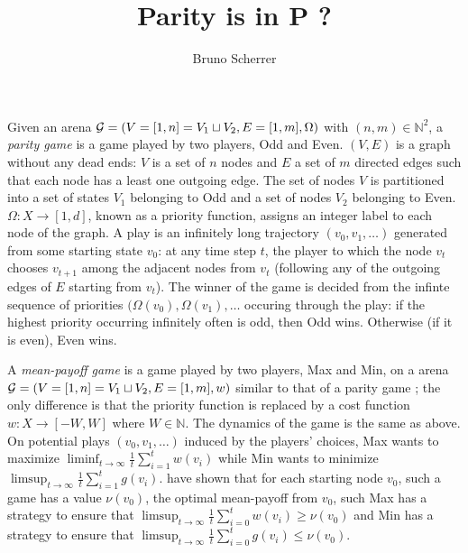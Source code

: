 \documentclass{article}
\title{Parity is in P ?}
\author{Bruno Scherrer}
\def\G{{\cal G}}
\def\N{\mathds N}
\begin{document}
\maketitle

\begin{abstract}
\end{abstract}


Given an arena $\G=(V=[1,n]=V_1 \sqcup V_2,E=[1,m],\Omega)$ with $(n,m) \in \N^2$, a \emph{parity game} is a game played by two players, Odd and Even.
$(V,E)$ is a graph without any dead ends: $V$ is a set of $n$ nodes and $E$ a set of $m$ directed edges such that each node has a least one outgoing edge. 
The set of nodes  $V$ is partitioned into a set of states $V_1$ belonging to Odd and a set of nodes $V_2$ belonging to Even. $\Omega:X \to [1,d]$, known as a priority function, assigns an integer label to each node of the graph.
A play is an infinitely long trajectory $(v_0,v_1,\dots)$ generated from some starting state $v_0$: at any time step $t$, the player to which the node $v_t$ chooses $v_{t+1}$ among the adjacent nodes from $v_t$ (following any of the outgoing edges of $E$ starting from $v_t$). The winner of the game is decided from the infinte sequence of priorities $(\Omega(v_0),\Omega(v_1),\dots$ occuring through the play: if the highest priority occurring infinitely often is odd, then Odd wins. Otherwise (if it is even), Even wins. 

A \emph{mean-payoff game} is a game played by two players, Max and Min, on a arena $\G=(V=[1,n]=V_1 \sqcup V_2, E=[1,m],w)$ similar to that of a parity game ; the only difference is that the priority function is replaced by a cost function $w:X \to [-W,W]$ where $W \in \N$. The dynamics of the game is the same as above. On potential plays $(v_0,v_1,\dots)$ induced by the players' choices, Max wants to maximize $\liminf_{t \to \infty}\frac{1}{t} \sum_{i=1}^t w(v_i)$ while Min wants to minimize $\limsup_{t \to \infty}\frac{1}{t} \sum_{i=1}^t g(v_i)$. \citet{ehrenfeucht79} have shown that for each starting node $v_0$,  such a game has a value $\nu(v_0)$, the optimal mean-payoff from $v_0$, such Max has a strategy to ensure that $\limsup_{t \to \infty}\frac{1}{t} \sum_{i=0}^t w(v_i) \ge \nu(v_0)$ and Min has a strategy to ensure that $\limsup_{t \to \infty}\frac{1}{t} \sum_{i=0}^t g(v_i) \le \nu(v_0)$.
\end{document}
